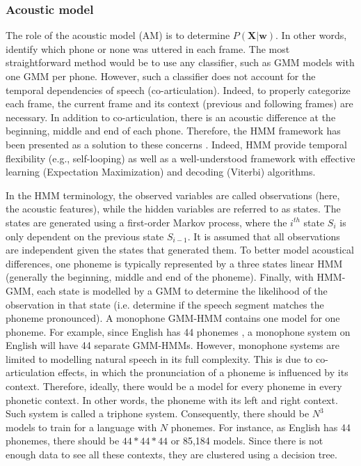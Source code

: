 \subsubsection{Acoustic model}%
The role of the acoustic model (AM) is to determine $P(\boldsymbol{X}|\boldsymbol{w})$. In other words, identify which phone or none was uttered in each frame. The most straightforward method would be to use any classifier, such as GMM models with one GMM per phone. However, such a classifier does not account for the temporal dependencies of speech (co-articulation). Indeed, to properly categorize each frame, the current frame and its context (previous and following frames) are necessary. In addition to co-articulation, there is an acoustic difference at the beginning, middle and end of each phone.
Therefore, the HMM framework has been presented as a solution to these concerns \cite{Dragon_system}. Indeed, HMM provide temporal flexibility (e.g., self-looping) as well as a well-understood framework with effective learning (Expectation Maximization) and decoding (Viterbi) algorithms. 

In the HMM terminology, the observed variables are called observations (here, the acoustic features), while the hidden variables are referred to as states. The states are generated using a first-order Markov process, where the $i^{th}$ state $S_i$ is only dependent on the previous state $S_{i-1}$. It is assumed that all observations are independent given the states that generated them. To better model acoustical differences, one phoneme is typically represented by a three states linear HMM (generally the beginning, middle and end of the phoneme). Finally, with HMM-GMM, each state is modelled by a GMM to determine the likelihood of the observation in that state (i.e. determine if the speech segment matches the phoneme pronounced). A monophone GMM-HMM contains one model for one phoneme. For example, since English has 44 phonemes \cite{bizzocchi2017many}, a monophone system on English will have 44 separate GMM-HMMs. However, monophone systems are limited to modelling natural speech in its full complexity. This is due to co-articulation effects, in which the pronunciation of a phoneme is influenced by its context. Therefore, ideally, there would be a model for every phoneme in every phonetic context. In other words, the phoneme with its left and right context. Such system is called a triphone system. Consequently, there should be $N^3$ models to train for a language with $N$ phonemes. For instance, as English has 44 phonemes, there should be $44 * 44 * 44$ or 85,184 models. Since there is not enough data to see all these contexts, they are clustered using a decision tree.

